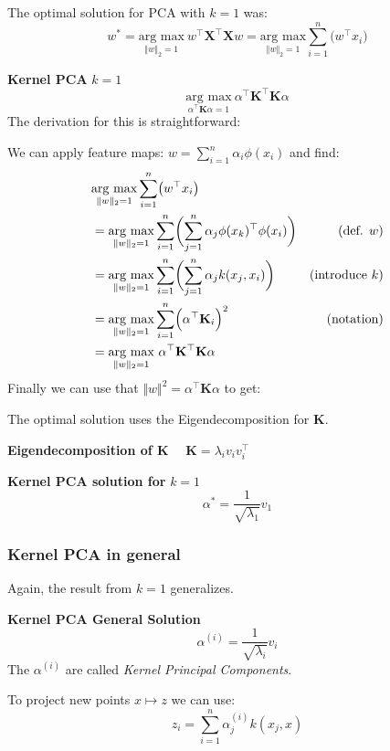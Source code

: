 The optimal solution for PCA with $k=1$ was:\\
$$
    w^* = \underset{\Vert w\Vert_2=1}{\text{arg max}}\ w^\top \mathbf{X}^\top \mathbf{X}w = \underset{\Vert w\Vert_2=1}{\text{arg max}} \sum_{i=1}^{n}\bigl( w^\top x_i \bigr)
$$

 \textbf{Kernel PCA} $k=1$
$$
    \underset{\alpha^\top \mathbf{K} \alpha=1}{\text{arg max}}\ \alpha^\top \mathbf{K}^\top\mathbf{K}\alpha
$$
The derivation for this is straightforward:

\newpage

We can apply feature maps: $\displaystyle w = \sum_{i=1}^{n}\alpha_i \phi(x_i)$ and find:
\begin{align*}
    &\underset{\Vert w\Vert_2=1}{\text{arg max}} \sum_{i=1}^{n}\bigl( w^\top x_i \bigr) \\
    &= \underset{\Vert w\Vert_2=1}{\text{arg max}} \sum_{i=1}^{n}\biggl( \sum_{j=1}^{n} \alpha_j\phi(x_k)^\top \phi(x_i) \biggr)            & \text{(def. $w$)}         \\
    &= \underset{\Vert w\Vert_2=1}{\text{arg max}} \sum_{i=1}^{n}\biggl( \sum_{j=1}^{n} \alpha_j k(x_j, x_i) \biggr)                        & \text{(introduce $k$)}    \\
    &= \underset{\Vert w\Vert_2=1}{\text{arg max}} \sum_{i=1}^{n}\Bigl( \alpha^\top \mathbf{K}_i \Bigr)^2                                   & \text{(notation)}         \\
    &= \underset{\Vert w\Vert_2=1}{\text{arg max}}\ \alpha^\top \mathbf{K}^\top\mathbf{K}\alpha
\end{align*}
Finally we can use that $\Vert w \Vert^2 = \alpha^\top \mathbf{K} \alpha$ to get:

The optimal solution uses the Eigendecomposition for $\mathbf{K}$.\\

\lemma \textbf{Eigendecomposition of $\mathbf{K}$} $\quad \mathbf{K} = \lambda_i v_i v_i^\top$

\theorem \textbf{Kernel PCA solution for} $k=1$
$$
    \alpha^* = \frac{1}{\sqrt{\lambda_1}} v_1
$$

\subsubsection{Kernel PCA in general}

Again, the result from $k=1$ generalizes.

\theorem \textbf{Kernel PCA General Solution}\\
$$
    \alpha^{(i)} = \frac{1}{\sqrt{\lambda_i}}v_i
$$
{\footnotesize
    \remark The $\alpha^{(i)}$ are called \textit{Kernel Principal Components}.
}

To project new points $x \mapsto z$ we can use:
$$
    z_i = \sum_{i=1}^{n}\alpha_j^{(i)}k(x_j,x)
$$